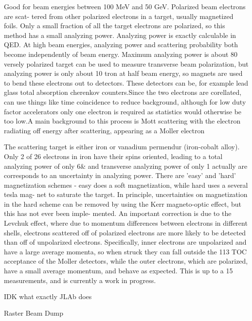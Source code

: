 Good for beam energies between 100 MeV and 50 GeV. Polarized beam electrons are scat-
tered from other polarized electrons in a target, usually magnetized foils. Only a small
fraction of all the target electrons are polarized, so this method has a small analyzing
power. Analyzing power is exactly calculable in QED. At high beam energies, analyzing
power and scattering probability both become independently of beam energy. Maximum
analyzing power is about 80%
versely polarized target can be used to measure transverse beam polarization, but analyzing
power is only about 10%
tron at half beam energy, so magnets are used to bend these electrons out to detectors.
These detectors can be, for example lead glass total absorption cherenkov counters.Since
the two electrons are corellated, can use things like time coincidence to reduce background,
although for low duty factor accelerators only one electron is required as statistics would
otherwise be too low.A main background to this process is Mott scattering with the electron
radiating off energy after scattering, appearing as a Moller electron

The scattering target is either iron or vanadium permendur (iron-cobalt alloy). Only 2 of
26 electrons in iron have their spins oriented, leading to a total analyzing power of only 6&
and transverse analyzing power of only 1%
actually are corresponds to an uncertainty in analyzing power. There are ’easy’ and ’hard’
magnetization schemes - easy does a soft magnetization, while hard uses a several tesla mag-
net to saturate the target. In principle, uncertainties on magnetization in the hard scheme
can be removed by using the Kerr magneto-optic effect, but this has not ever been imple-
mented. An important correction is due to the Levchuk effect, where due to momentum
differences between electrons in different shells, electrons scattered off of polarized electrons
are more likely to be detected than off of unpolarized electrons. Specifically, inner electrons
are unpolarized and have a large average momenta, so when struck they can fall outside the
113 TOC
acceptance of the Moller detectors, while the outer electrons, which are polarized, have a
small average momentum, and behave as expected. This is up to a 15%
measurements, and is currently a work in progress.

IDK what exactly JLAb does

Raster
Beam Dump